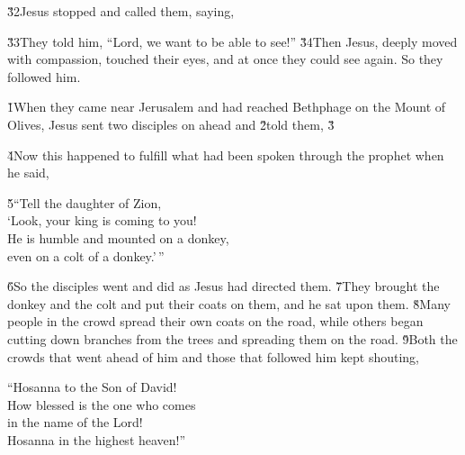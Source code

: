 \v{32}Jesus stopped and called them, saying, 

\v{33}They told him, ``Lord, we want to be able to see!'' \v{34}Then Jesus, deeply moved with compassion, touched their eyes, and at once they could see again. So they followed him.

\v{1}When they came near Jerusalem and had reached Bethphage on the Mount of Olives, Jesus sent two disciples on ahead and \v{2}told them,  \v{3}

\v{4}Now this happened to fulfill what had been spoken through the prophet when he said,

\begin{poetry}
\poeml \v{5}``Tell the daughter of Zion, \\
\poemll    `Look, your king is coming to you! \\
\poeml He is humble and mounted on a donkey, \\
\poemll    even on a colt of a donkey.'\,''
\end{poetry}

\v{6}So the disciples went and did as Jesus had directed them. \v{7}They brought the donkey and the colt and put their coats on them, and he sat upon them. \v{8}Many people in the crowd spread their own coats on the road, while others began cutting down branches from the trees and spreading them on the road. \v{9}Both the crowds that went ahead of him and those that followed him kept shouting,

\begin{poetry}
\poeml ``Hosanna to the Son of David! \\
\poeml How blessed is the one who comes \\
\poemll    in the name of the Lord! \\
\poeml Hosanna in the highest heaven!''
\end{poetry}

